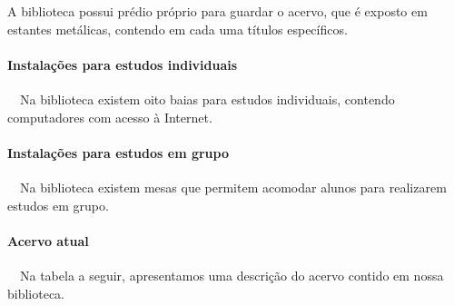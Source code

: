 
A biblioteca possui prédio próprio para guardar o acervo, que é exposto em estantes metálicas, contendo em cada uma títulos específicos. 


\paragraph{Instalações para estudos individuais}\
\
Na biblioteca existem oito baias para estudos individuais, contendo computadores com acesso à Internet. 

\paragraph{Instalações para estudos em grupo}\
\
Na biblioteca existem mesas que permitem acomodar alunos para realizarem estudos em grupo.

\paragraph{Acervo atual}\
\
Na tabela a seguir, apresentamos uma descrição do acervo contido em nossa biblioteca.

